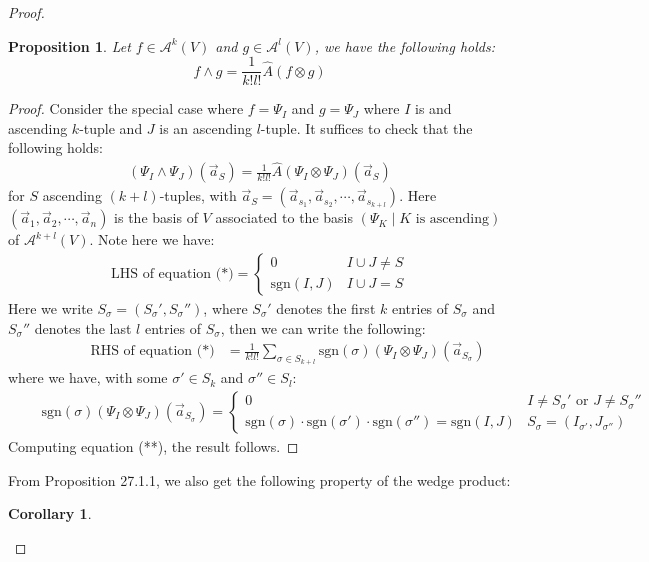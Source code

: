 \documentclass[15pt]{book}
\theoremstyle{break}
\theoremstyle{break}
\newtheorem{prop}[lem]{Proposition}
\newtheorem{corT}[lem]{Corollary}
\newcommand{\A}{\mathcal{A}}
\begin{document}
\begin{proof}
\begin{prop}\setlength{\leftskip}{1cm}
Let $f \in \A^k(V)$ and $g \in \A^l(V)$, we have the following holds:
$$f\wedge g = \frac{1}{k!l!}\hat{A}(f\otimes g)$$
\end{prop} 
\begin{proof}\setlength{\leftskip}{1cm}
Consider the special case where $f = \Psi_I$ and $g = \Psi_J$ where $I$ is and ascending $k$-tuple and $J$ is an ascending $l$-tuple. It suffices to check that the following holds:
\begin{align*}
(\Psi_I \wedge \Psi_J)(\vec{a}_S) = \frac{1}{k!l!}\hat{A}(\Psi_I \otimes \Psi_J)(\vec{a}_S) \tag{*}
\end{align*}
for $S$ ascending $(k+l)$-tuples, with $\vec{a}_S = (\vec{a}_{s_1},\vec{a}_{s_2}, \cdots, \vec{a}_{s_{k+l}})$. Here $(\vec{a}_1,\vec{a}_2,\cdots,\vec{a}_n)$ is the basis of $V$ associated to the basis $(\Psi_K \mid K \text{ is ascending})$ of $\A^{k+l}(V)$. Note here we have:
\begin{align*}
\text{LHS of equation (*)} = \begin{cases}0 & I \cup J \neq S \\ \text{sgn}(I,J)& I \cup J = S \end{cases}
\end{align*}
Here we write $S_{\sigma} = (S_{\sigma}', S_{\sigma}'')$, where $S_{\sigma}'$ denotes the first $k$ entries of $S_{\sigma}$ and $S_{\sigma}''$ denotes the last $l$ entries of $S_{\sigma}$, then we can write the following:
\begin{align*}
\qquad\qquad\text{RHS of equation (*)} &= \frac{1}{k!l!}\sum_{\sigma \in S_{k+l}}\text{sgn}(\sigma) (\Psi_I \otimes \Psi_J ) (\vec{a}_{S_{\sigma}}) \tag{**}
\end{align*}
where we have, with some $\sigma' \in S_k$ and $\sigma'' \in S_l$:
\begin{align*}
\qquad\text{sgn}(\sigma) (\Psi_I \otimes \Psi_J ) (\vec{a}_{S_{\sigma}}) = \begin{cases} 0 & I\neq S_\sigma' \text{ or } J \neq S_\sigma'' \\ \text{sgn}(\sigma)\cdot \text{sgn}(\sigma')\cdot \text{sgn}(\sigma'')=\text{sgn}(I,J) & S_{\sigma} = (I_{\sigma'}, J_{\sigma''})\end{cases}
\end{align*}
Computing equation (**), the result follows.
\end{proof}
From Proposition 27.1.1, we also get the following property of the wedge product:
\begin{corT}\setlength{\leftskip}{1cm}

\end{corT}
\end{proof}
\end{document}
